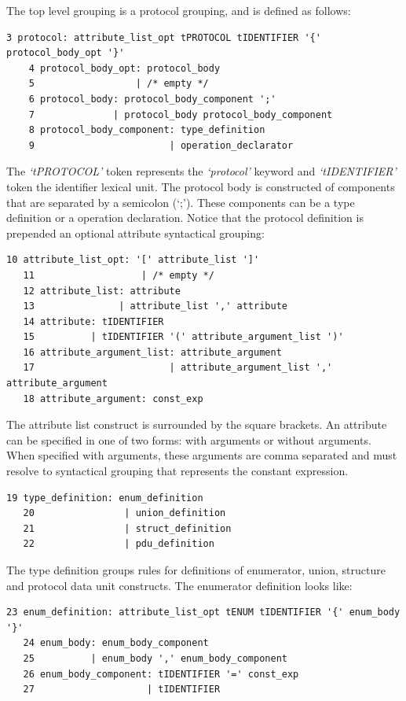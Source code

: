\documentclass[times, utf8, diplomski]{fer}
\begin{document}
The top level grouping is a protocol grouping, and is defined as follows:
\lstset{language=IDL}
\lstset{basicstyle=\tiny}
\begin{lstlisting}[frame=tb]
    3 protocol: attribute_list_opt tPROTOCOL tIDENTIFIER '{' protocol_body_opt '}'
    4 protocol_body_opt: protocol_body
    5                  | /* empty */
    6 protocol_body: protocol_body_component ';'
    7              | protocol_body protocol_body_component
    8 protocol_body_component: type_definition
    9                        | operation_declarator
\end{lstlisting}

The \emph{`tPROTOCOL'} token represents the \emph{`protocol'} keyword and 
\emph{`tIDENTIFIER'} token the identifier lexical unit. The protocol body is 
constructed of components that are separated by a semicolon (`;'). These components 
can be a type definition or a operation declaration. Notice that the protocol 
definition is prepended an optional attribute syntactical grouping:
\lstset{language=IDL}
\lstset{basicstyle=\tiny}
\begin{lstlisting}[frame=tb]
   10 attribute_list_opt: '[' attribute_list ']'
   11                   | /* empty */
   12 attribute_list: attribute
   13               | attribute_list ',' attribute
   14 attribute: tIDENTIFIER
   15          | tIDENTIFIER '(' attribute_argument_list ')'
   16 attribute_argument_list: attribute_argument
   17                        | attribute_argument_list ',' attribute_argument
   18 attribute_argument: const_exp
\end{lstlisting}

The attribute list construct is surrounded by the square brackets. An attribute 
can be specified in one of two forms: with arguments or without arguments. 
When specified with arguments, these arguments are comma separated and must 
resolve to syntactical grouping that represents the constant expression.
\lstset{language=IDL}
\lstset{basicstyle=\tiny}
\begin{lstlisting}[frame=tb]
   19 type_definition: enum_definition
   20                | union_definition
   21                | struct_definition
   22                | pdu_definition   
\end{lstlisting}

The type definition groups rules for definitions of enumerator, union, structure 
and protocol data unit constructs. The enumerator definition looks like:
\lstset{language=IDL}
\lstset{basicstyle=\tiny}
\begin{lstlisting}[frame=tb]
   23 enum_definition: attribute_list_opt tENUM tIDENTIFIER '{' enum_body '}'
   24 enum_body: enum_body_component
   25          | enum_body ',' enum_body_component
   26 enum_body_component: tIDENTIFIER '=' const_exp
   27                    | tIDENTIFIER
\end{lstlisting}
\end{document}
